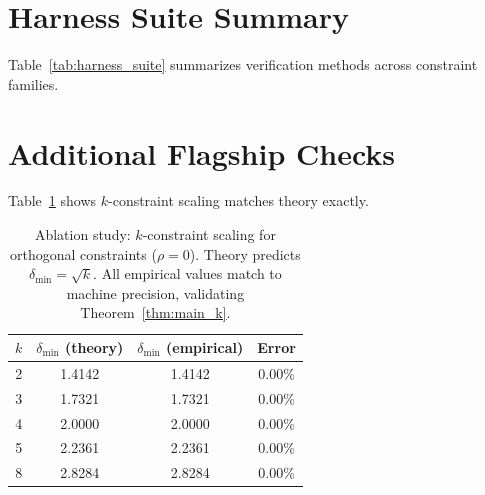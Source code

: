 \documentclass{article}
\theoremstyle{plain}
\theoremstyle{definition}
\theoremstyle{remark}
\begin{document}
\section{Harness Suite Summary}\label{app:harness_suite}
Table~\ref{tab:harness_suite} summarizes verification methods across constraint families.

\begin{table}[ht]
\centering
\small
\caption{Harness suite across representation families. Core results use deterministic verification (parsers, solvers, FFT). Interactive prompts are supplemental demonstrations with human judgment, not part of judge-free claims.}
\label{tab:harness_suite}
\end{table}

\section{Additional Flagship Checks}\label{app:k_scaling}
Table~\ref{tab:ablation} shows $k$-constraint scaling matches theory exactly.

\begin{table}[ht]
\centering
\small
\caption{Ablation study: $k$-constraint scaling for orthogonal constraints ($\rho=0$). Theory predicts $\delta_{\min} = \sqrt{k}$. All empirical values match to machine precision, validating Theorem~\ref{thm:main_k}.}
\label{tab:ablation}
\begin{tabular}{cccc}
\toprule
$k$ & $\delta_{\min}$ (theory) & $\delta_{\min}$ (empirical) & Error \\
\midrule
2 & 1.4142 & 1.4142 & 0.00\% \\
3 & 1.7321 & 1.7321 & 0.00\% \\
4 & 2.0000 & 2.0000 & 0.00\% \\
5 & 2.2361 & 2.2361 & 0.00\% \\
8 & 2.8284 & 2.8284 & 0.00\% \\
\bottomrule
\end{tabular}
\end{table}
\end{document}

